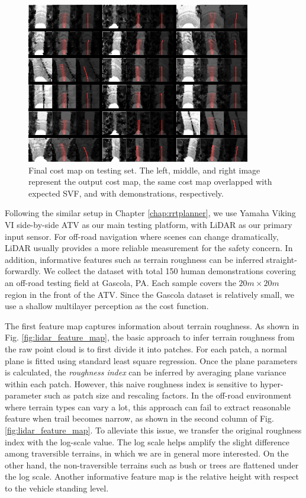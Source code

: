\documentclass[../thesis.tex]{subfiles}
\begin{document}
\begin{figure}[t]
	\begin{center}
		\centerline{\includegraphics[width=0.8\columnwidth]{./DIRL/fig/gradtestImg040.png}}
		\caption{Final cost map on testing set. The left, middle, and right image represent the output cost map, the same cost map overlapped with expected SVF, and with demonstrations, respectively.}
		\label{fig:final_cost_map}
	\end{center}
\end{figure} 

Following the similar setup in Chapter \ref{chap:rrtplanner}, we use Yamaha Viking VI side-by-side ATV as our main testing platform, with LiDAR as our primary input sensor. 
For off-road navigation where scenes can change dramatically, LiDAR usually provides a more reliable measurement for the safety concern.
In addition, informative features such as terrain roughness can be inferred straight-forwardly.
We collect the dataset with total 150 human demonstrations covering an off-road testing field at Gascola, PA. Each sample covers the $20m \times 20m$ region in the front of the ATV. Since the Gascola dataset is relatively small, we use a shallow multilayer perception as the cost function. 

The first feature map captures information about terrain roughness.
As shown in Fig. \ref{fig:lidar_feature_map}, the basic approach to infer terrain roughness from the raw point cloud is to first divide it into patches. 
For each patch, a normal plane is fitted using standard least square regression. 
Once the plane parameters is calculated, the \textit{roughness index} can be inferred by averaging plane variance within each patch. 
However, this naive roughness index is sensitive to hyper-parameter such as patch size and rescaling factors. 
In the off-road environment where terrain types can vary a lot, this approach can fail to extract reasonable feature when trail becomes narrow, as shown in the second column of Fig. \ref{fig:lidar_feature_map}. 
To alleviate this issue, we transfer the original roughness index with the log-scale value. 
The log scale helps amplify the slight difference among traversible terrains, in which we are in general more interested.
On the other hand, the non-traversible terrains such as bush or trees are flattened under the log scale. 
Another informative feature map is the relative height with respect to the vehicle standing level. 
\end{document}
